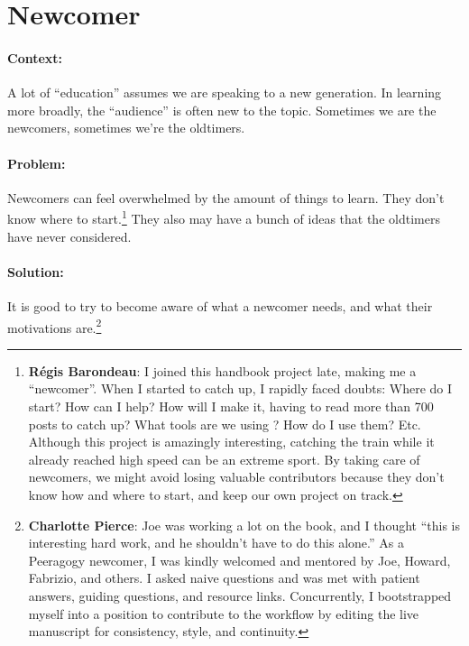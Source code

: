 \section{Newcomer}
\paragraph{Context:}
A lot of ``education'' assumes we are speaking to a new generation. 
In learning more broadly, the ``audience'' is often new to the topic.
Sometimes we are the newcomers, sometimes we're the oldtimers.

\paragraph{Problem:} Newcomers can feel overwhelmed by the amount of things to learn.  They
don't know where to start.\footnote{\textbf{R\'egis Barondeau}: I joined this handbook project late, making me
a ``newcomer''. When I started to catch up, I rapidly faced doubts:
Where do I start? How can I help? How will I make it, having to read
more than 700 posts to catch up? What tools are we using ? How do I use
them? Etc. Although this project is amazingly interesting, catching the
train while it already reached high speed can be an extreme sport. By
taking care of newcomers, we might avoid losing valuable contributors
because they don't know how and where to start, and keep our own project
on track.}  They also may have a bunch of ideas that the oldtimers have
never considered.

\paragraph{Solution:} It is good to try to become aware of what a newcomer
needs, and what their motivations are.\footnote{\textbf{Charlotte Pierce}: Joe was working
a lot on the book, and I thought ``this is interesting hard work, and he shouldn't have to do
this alone.'' As a Peeragogy newcomer, I was kindly welcomed and
mentored by Joe, Howard, Fabrizio, and others. I asked naive questions
and was met with patient answers, guiding questions, and resource links.
Concurrently, I bootstrapped myself into a position to contribute to the
workflow by editing the live manuscript for consistency, style, and continuity.}

